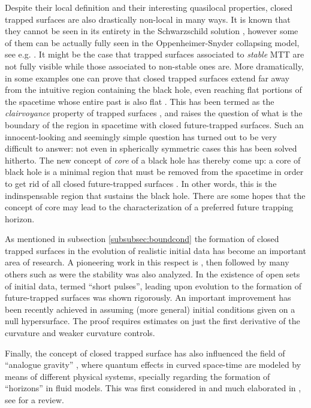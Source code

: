 \documentclass[12pt]{iopart}
\begin{document}
Despite their local definition and their interesting quasilocal properties, closed trapped surfaces are also drastically non-local in many ways. It is known that they cannot be seen in its entirety in the Schwarzschild solution \cite{WI}, however some of them can be actually fully seen in the Oppenheimer-Snyder collapsing model, see e.g. \cite{BJS}. It might be the case that trapped surfaces associated to {\em stable} MTT are not fully visible while those associated to non-stable ones are. More dramatically, in some examples one can prove that closed trapped surfaces extend far away from the intuitive region containing the black hole, even reaching flat portions of the spacetime whose entire past is also flat \cite{BeS0}. This has been termed as the {\em clairvoyance} property of trapped surfaces \cite{BeS}, and raises the question of what is the boundary of the region in spacetime with closed future-trapped surfaces. Such an innocent-looking and seemingly simple question has turned out to be very difficult to answer: not even in spherically symmetric cases this has been solved hitherto. The new concept of {\em core} of a black hole has thereby come up: a core of black hole is a minimal region that must be removed from the spacetime in order to get rid of all closed future-trapped surfaces \cite{BeS}. In other words, this is the indinspensable region that sustains the black hole. There are some hopes that the concept of core may lead to the characterization of a preferred future trapping horizon.

As mentioned in subsection \ref{subsubsec:boundcond} the formation of closed trapped surfaces in the evolution of realistic initial data has become an important area of research. A pioneering work in this respect is \cite{GC5}, then followed by many others such as \cite{GC1} were the stability was also analyzed. In \cite{Chris1} the existence of open sets of initial data, termed ``short pulses'', leading upon evolution to the formation of future-trapped surfaces was shown rigorously. An important improvement has been recently achieved in \cite{KlRo} assuming (more general) initial conditions given on a null hypersurface. The proof requires estimates on just the first derivative of the curvature and weaker curvature controls.

Finally, the concept of closed trapped surface has also influenced the field of ``analogue gravity'' \cite{BLV}, where quantum effects in curved space-time are modeled by means of different physical systems, specially regarding the formation of ``horizons'' in fluid models. This was first considered in \cite{Unr} and much elaborated in \cite{Vis}, see \cite{BLV} for a review.
\end{document}
